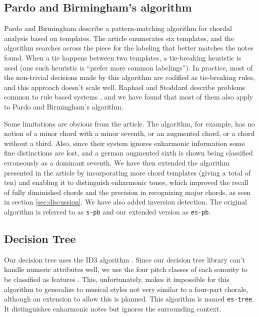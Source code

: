 \documentclass{article}
\begin{document}
\subsection{Pardo and Birmingham's algorithm}
\label{sec:pardo}


Pardo and Birmingham \cite{pardo.ea:algorithms} describe a
pattern-matching algorithm for chordal analysis based on templates.
The article enumerates six templates, and the algorithm searches
across the piece for the labeling that better matches the notes found.
When a tie happens between two templates, a tie-breaking heuristic is
used (one such heuristic is ``prefer more common labelings''). In
practice, most of the non-trivial decisions made by this algorithm are
codified as tie-breaking rules, and this approach doesn't scale
well. Raphael and Stoddard describe problems common to rule based
systems \cite{raphael.ea:harmonic}, and we have found that most of
them also apply to Pardo and Birmingham's algorithm.

Some limitations are obvious from the article. The algorithm, for
example, has no notion of a minor chord with a minor seventh, or an
augmented chord, or a chord without a third. Also, since their system
ignores enharmonic information some fine distinctions are lost, and a
german augmented sixth is shown being classified erroneously as a
dominant seventh. We have then extended the algorithm presented in the
article by incorporating more chord templates (giving a total of ten)
and enabling it to distinguish enharmonic tones, which improved the
recall of fully diminished chords and the precision in recognizing
major chords, as seen in section \ref{sec:discussion}. We have also
added inversion detection. The original algorithm is referred to as
\texttt{s-pb} and our extended version as \texttt{es-pb}.

\subsection{Decision Tree}
\label{sec:tree}

Our decision tree uses the ID3 algorithm \cite{mitchell:machine}.
Since our decision tree library can't handle numeric attributes well,
we use the four pitch classes of each sonority to be classified as
features . This, unfortunately, makes it impossible for this algorithm
to generalize to musical styles not very similar to a four-part
chorale, although an extension to allow this is planned. This
algorithm is named \texttt{es-tree}. It distinguishes enharmonic notes
but ignores the surrounding context.
\end{document}
